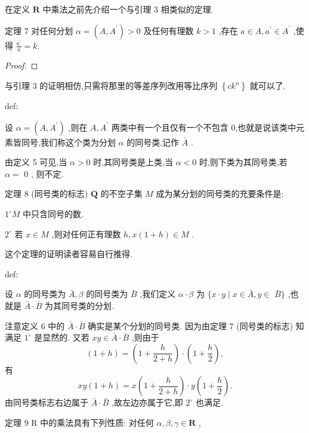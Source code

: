 在定义 \(\mathbf{R}\) 中乘法之前先介绍一个与引理 3 相类似的定理.

定理 7 对任何分划 \(\alpha  = \left( {A,{A}^{\prime }}\right)  > 0\) 及任何有理数 \(k > 1\) ,存在 \(a \in  A,{a}^{\prime } \in  {A}^{\prime }\) ,使得 \(\frac{{a}^{\prime }}{a} = k.\)

\begin{proof}

\end{proof}
与引理 3 的证明相仿,只需将那里的等差序列改用等比序列 \(\left\{  {c{k}^{n}}\right\}\) 就可以了.

\begin{definition}{}{def:}

\end{definition}
设 \(\alpha  = \left( {A,{A}^{\prime }}\right)\) ,则在 \(A,{A}^{\prime }\) 两类中有一个且仅有一个不包含 0,也就是说该类中元素皆同号,我们称这个类为分划 \(\alpha\) 的同号类,记作 \(\bar{A}\) .

由定义 5 可见,当 \(\alpha  > 0\) 时,其同号类是上类,当 \(\alpha  < 0\) 时,则下类为其同号类,若 \(\alpha  =\) 0 , 则不定.

定理 8 (同号类的标志) \(\mathbf{Q}\) 的不空子集 \(M\) 成为某分划的同号类的充要条件是:

\({1}^{ \circ  }M\) 中只含同号的数.

\({2}^{ \circ  }\) 若 \(x \in  M\) ,则对任何正有理数 \(h,x\left( {1 + h}\right)  \in  M\) .

这个定理的证明读者容易自行推得.

\begin{definition}{}{def:}

\end{definition}
设 \(\alpha\) 的同号类为 \(\bar{A},\beta\) 的同号类为 \(\bar{B}\) ,我们定义 \(\alpha  \cdot  \beta\) 为 \(\{ x \cdot  y \mid  x \in  \bar{A},y \in\)  \(\bar{B}\}\) ,也就是 \(\bar{A} \cdot  \bar{B}\) 为其同号类的分划.

注意定义 6 中的 \(\bar{A} \cdot  \bar{B}\) 确实是某个分划的同号类. 因为由定理 7 (同号类的标志) 知满足 \({1}^{ \circ  }\) 是显然的. 又若 \({xy} \in  \bar{A} \cdot  \bar{B}\) ,则由于
\[
\left( {1 + h}\right)  = \left( {1 + \frac{h}{2 + h}}\right)  \cdot  \left( {1 + \frac{h}{2}}\right) ,
\]
有
\[
{xy}\left( {1 + h}\right)  = x\left( {1 + \frac{h}{2 + h}}\right)  \cdot  y\left( {1 + \frac{h}{2}}\right) .
\]
由同号类标志右边属于 \(\bar{A} \cdot  \bar{B}\) ,故左边亦属于它,即 \({2}^{ \circ  }\) 也满足.

定理 9 \(\mathrm{R}\) 中的乘法具有下列性质: 对任何 \(\alpha ,\beta ,\gamma  \in  \mathbf{R}\) ,

